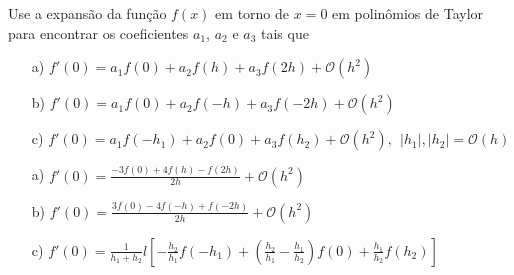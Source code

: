 \begin{exer} Use a expansão da função $f(x)$ em torno de $x=0$ em polinômios de Taylor para encontrar os coeficientes $a_1$, $a_2$ e $a_3$ tais que
\begin{itemize}
\item[a)] $f'(0)=a_1f(0)+a_2f(h)+a_3f(2h) + \mathcal{O}(h^2)$
\item[b)] $f'(0)=a_1f(0)+a_2f(-h)+a_3f(-2h) + \mathcal{O}(h^2)$
\item[c)] $f'(0)=a_1f(-h_1)+a_2f(0)+a_3f(h_2) + \mathcal{O}(h^2),~~|h_1|, |h_2|=\mathcal{O}(h)$
\end{itemize}
\end{exer}
\begin{resp}
%  
\begin{itemize}
\item[a)] $f'(0)=\frac{-3f(0)+4f(h)-f(2h)}{2h} + \mathcal{O}(h^2)$
\item[b)] $f'(0)=\frac{3f(0)-4f(-h)+f(-2h)}{2h} + \mathcal{O}(h^2)$
\item[c)] $f'(0)=\frac{1}{h_1+h_2}l\left[-\frac{h_2}{h_1}f(-h_1) +\left(\frac{h_2}{h_1}-\frac{h_1}{h_2}\right)f(0)+ \frac{h_1}{h_2}f(h_2)\right]$
\end{itemize}    
%  
\end{resp}

